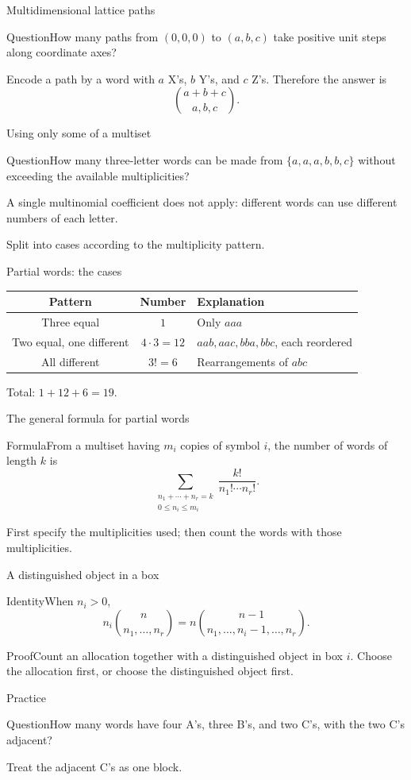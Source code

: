 \documentclass[aspectratio=169,11pt]{beamer}
\newcommand{\Thm}[2]{\begin{block}{#1}#2\end{block}}
\renewcommand{\Proof}[1]{\begin{block}{Proof}\normalsize #1\end{block}}
\newcommand{\Question}[1]{\begin{block}{Question}#1\end{block}}
\newcommand{\gap}{\par\medskip}
\begin{document}
\begin{frame}{Multidimensional lattice paths}
\large
\Question{How many paths from $(0,0,0)$ to $(a,b,c)$ take positive unit steps along coordinate axes?}
\gap Encode a path by a word with $a$ X's, $b$ Y's, and $c$ Z's. Therefore the answer is
\[\binom{a+b+c}{a,b,c}.\]
\end{frame}
\begin{frame}{Using only some of a multiset}
\large
\Question{How many three-letter words can be made from $\{a,a,a,b,b,c\}$ without exceeding the available multiplicities?}
\gap A single multinomial coefficient does not apply: different words can use different numbers of each letter.
\gap Split into cases according to the multiplicity pattern.
\end{frame}
\begin{frame}{Partial words: the cases}
\large
\normalsize
\begin{center}\renewcommand{\arraystretch}{1.4}
\begin{tabular}{ccl}
Pattern & Number & Explanation\\\hline
Three equal & $1$ & Only $aaa$\\
Two equal, one different & $4\cdot3=12$ & $aab,aac,bba,bbc$, each reordered\\
All different & $3!=6$ & Rearrangements of $abc$
\end{tabular}\end{center}
\gap Total: $1+12+6=19$.
\end{frame}
\begin{frame}{The general formula for partial words}
\large
\Thm{Formula}{From a multiset having $m_i$ copies of symbol $i$, the number of words of length $k$ is
\[\sum_{\substack{n_1+\cdots+n_r=k\\0\leq n_i\leq m_i}}
\frac{k!}{n_1!\cdots n_r!}.\]}
\gap First specify the multiplicities used; then count the words with those multiplicities.
\end{frame}
\begin{frame}{A distinguished object in a box}
\large
\Thm{Identity}{When $n_i>0$,
\[n_i\binom n{n_1,\ldots,n_r}
=n\binom{n-1}{n_1,\ldots,n_i-1,\ldots,n_r}.\]}
\Proof{Count an allocation together with a distinguished object in box $i$. Choose the allocation first, or choose the distinguished object first.}
\end{frame}
\begin{frame}{Practice}
\large
\Question{How many words have four A's, three B's, and two C's, with the two C's adjacent?}
\gap Treat the adjacent C's as one block.
\end{frame}
\end{document}
